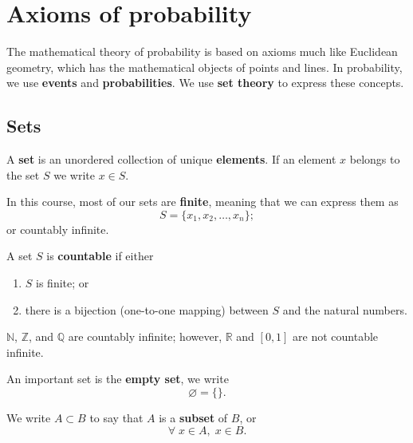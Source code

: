 \chapter{Axioms of probability}

The mathematical theory of probability is based on axioms much like Euclidean geometry, which has the mathematical objects of points and lines. In probability, we use \textbf{events} and \textbf{probabilities}. We use \textbf{set theory} to express these concepts.

\section{Sets}

\begin{definition}[Set]
    A \textbf{set} is an unordered collection of unique \textbf{elements}. If an element $x$ belongs to the set $S$ we write $x \in S$.
\end{definition}

In this course, most of our sets are \textbf{finite}, meaning that we can express them as \[ S = \{ x_1, x_2, \ldots, x_n \}; \] or countably infinite.

\begin{definition}[Countable]
    A set $S$ is \textbf{countable} if either
    \begin{enumerate}
        \item $S$ is finite; or
        \item there is a bijection (one-to-one mapping) between $S$ and the natural numbers.
    \end{enumerate}
\end{definition}

\begin{example}
    $\mathbb{N}$, $\mathbb{Z}$, and $\mathbb{Q}$ are countably infinite; however, $\mathbb{R}$ and $[0, 1]$ are not countable infinite.
\end{example}

\begin{definition}
    An important set is the \textbf{empty set}, we write \[ \varnothing = \{ \}. \]
\end{definition}

\begin{definition}[Subset]
    We write $A \subset B$ to say that $A$ is a \textbf{subset} of $B$, or \[ \forall \; x \in A, \; x \in B. \]
\end{definition}

